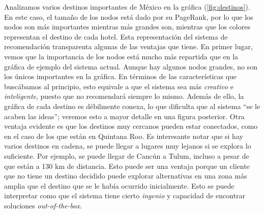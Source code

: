 \documentclass[12pt]{report}
\begin{document}
Analizamos varios destinos importantes de México en la gráfica (\ref{fig:destinos}). En este caso, el tamaño de los nodos está dado por su PageRank, por lo que los nodos son más importantes mientras más grandes son, mientras que los colores representan el destino de cada hotel. Esta representación del sistema de recomendación transparenta algunas de las ventajas que tiene. En primer lugar, vemos que la importancia de los nodos está mucho más repartida que en la gráfica de ejemplo del sistema actual. Aunque hay algunos nodos grandes, no son los únicos importantes en la gráfica. En términos de las características que buscábamos al principio, esto equivale a que el sistema sea más \emph{creativo} e \emph{inteligente}, puesto que no recomendará siempre lo mismo. Además de ello, la gráfica de cada destino es débilmente conexa, lo que dificulta que al sistema ``se le acaben las ideas''; veremos esto a mayor detalle en una figura posterior. Otra ventaja evidente es que los destinos muy cercanos pueden estar conectados, como en el caso de los que están en Quintana Roo. Es interesante notar que si hay varios destinos en cadena, se puede llegar a lugares muy lejanos si se explora lo suficiente. Por ejemplo, se puede llegar de Cancún a Tulum, incluso a pesar de que están a 130 km de distancia. Esto puede ser una ventaja porque un cliente que no tiene un destino decidido puede explorar alternativas en una zona más amplia que el destino que se le había ocurrido inicialmente. Esto se puede interpretar como que el sistema tiene cierto \emph{ingenio} y capacidad de encontrar soluciones \emph{out-of-the-box}.
\end{document}
